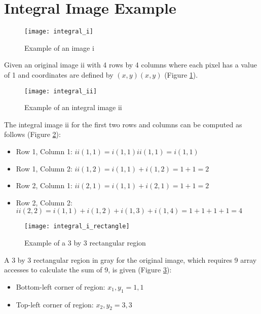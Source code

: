 \appendix

\section{Integral Image Example} \label{integral-image-example}

\begin{figure}[H]
  \texttt{[image: integral\_i]}
  \caption{Example of an image i}
  \label{fig:integral-i}
\end{figure}

Given an original image ii with 4 rows by 4 columns where each pixel has a value of 1 and coordinates are defined by $(x,y)(x,y)$ (Figure \ref{fig:integral-i}).

\begin{figure}[H]
  \centering
  \texttt{[image: integral\_ii]}
  \caption{Example of an integral image ii}
  \label{fig:integral-ii}
\end{figure}

The integral image ii for the first two rows and columns can be computed as follows (Figure \ref{fig:integral-ii}):

\begin{itemize}
  \item Row 1, Column 1: $ii(1,1)=i(1,1)ii(1,1)=i(1,1)$
  \item Row 1, Column 2: $ii(1,2)=i(1,1)+i(1,2)=1+1=2$
  \item Row 2, Column 1: $ii(2,1)=i(1,1)+i(2,1)=1+1=2$
  \item Row 2, Column 2: $ii(2,2)=i(1,1)+i(1,2)+i(1,3)+i(1,4)=1+1+1+1=4$
\end{itemize}

\begin{figure}[H]
  \centering
  \texttt{[image: integral\_i\_rectangle]}
  \caption{Example of a 3 by 3 rectangular region}
  \label{fig:integral-i-rectangle}
\end{figure}

A 3 by 3 rectangular region in gray for the original image, which requires 9 array accesses to calculate the sum of 9, is given (Figure \ref{fig:integral-i-rectangle}):

\begin{itemize}
  \item Bottom-left corner of region: $x_1,y_1=1,1$
  \item Top-left corner of region: $x_2,y_2=3,3$
\end{itemize}

